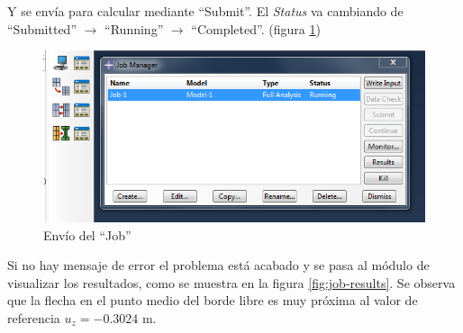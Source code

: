 \documentclass[spanish,a4paper,12pt]{article}
\begin{document}
Y se envía para calcular mediante ``Submit''. El \emph{Status} va cambiando de ``Submitted'' $\to$ ``Running'' $\to$ ``Completed''. 
(figura \ref{fig:job-submit})
\begin{figure}[h!tp]
\centering
\includegraphics[scale=0.5]{capturas/38-job.png}
\caption{Envío del ``Job''}
\label{fig:job-submit}
\end{figure}
Si no hay mensaje de error el problema está acabado y se pasa al módulo de visualizar los resultados, como se muestra en la
figura \ref{fig:job-results}.
Se observa que la flecha en el punto medio del borde libre es muy próxima al valor de referencia  $u_{z}=-0.3024$ m.
\end{document}
